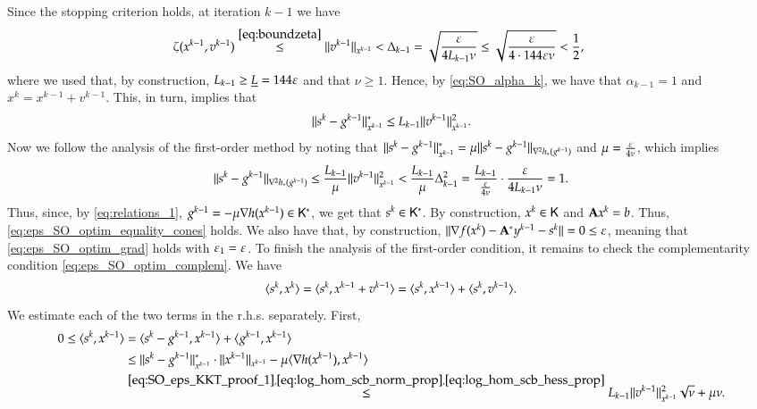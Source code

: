 Since the stopping criterion holds, at iteration $k-1$ we have
\begin{align}
\hspace{-1em}\zeta(x^{k-1},v^{k-1}) &\stackrel{\eqref{eq:boundzeta}}{\leq} \|v^{k-1}\|_{x^{k-1}} < \Delta_{k-1} = \sqrt{\frac{\varepsilon}{4L_{k-1}\nu}} \leq \sqrt{\frac{\varepsilon}{4 \cdot 144 \varepsilon \nu}} < \frac{1}{2}\label{eq:SO_eps_KKT_proof_0},
\end{align}
where we used that, by construction, $L_{k-1} \geq \underline{L} = 144 \varepsilon$ and that $\nu \geq 1$. Hence, by \eqref{eq:SO_alpha_k}, we have that $\alpha_{k-1}=1$ and $x^{k}=x^{k-1}+v^{k-1}$. This, in turn, implies that 
\begin{equation}
\label{eq:SO_eps_KKT_proof_1}
\lVert s^{k}-g^{k-1}\rVert^{\ast}_{x^{k-1}}\leq  L_{k-1}\lVert v^{k-1}\rVert^{2}_{x^{k-1}}.
\end{equation}
Now we follow the analysis of the first-order method by noting that $\lVert s^{k}-g^{k-1}\rVert^{\ast}_{x^{k-1}}=\mu\lVert s^{k}-g^{k-1}\rVert_{\nabla^{2}h_{\ast}(g^{k-1})}$ and $\mu=\frac{\varepsilon}{4\nu}$, 
which implies
\begin{equation}
\label{eq:SO_eps_KKT_proof_2}
\lVert s^{k}-g^{k-1}\rVert_{\nabla^{2}h_{\ast}(g^{k-1})}\leq\frac{L_{k-1}}{\mu}\lVert v^{k-1}\rVert^{2}_{x^{k-1}}<\frac{L_{k-1}}{\mu}\Delta_{k-1}^{2} = \frac{L_{k-1}}{\frac{\varepsilon}{4\nu}} \cdot \frac{\varepsilon}{4L_{k-1}\nu} = 1.
\end{equation}
Thus, since, by \eqref{eq:relations_1}, $g^{k-1}=-\mu\nabla h(x^{k-1})\in \mathsf{K}^{\ast}$, we get that $s^{k}\in\mathsf{K}^{\ast}$. By construction, $x^{k}\in \mathsf{K}$ and ${\mathbf A} x^{k} = b$. Thus, \eqref{eq:eps_SO_optim_equality_cones} holds. We also have that, by construction, $\|\nabla f(x^{k})-{\mathbf A}^{\ast}y^{k-1} - s^{k}\|=0\leq \varepsilon$, meaning that \eqref{eq:eps_SO_optim_grad} holds with $\varepsilon_1=\varepsilon$. To finish the analysis of the first-order condition, it remains to check the complementarity condition \eqref{eq:eps_SO_optim_complem}. 
We have
\begin{align*}
\langle s^{k},x^{k}\rangle=\langle s^{k},x^{k-1}+v^{k-1}\rangle=\langle s^{k},x^{k-1}\rangle+\langle s^{k},v^{k-1}\rangle.
\end{align*}
We estimate each of the two terms in the r.h.s. separately. First, 
\begin{align*}
0 \leq \inner{s^{k},x^{k-1}}&%
=  \inner{s^{k}-g^{k-1},x^{k-1}} + \inner{g^{k-1},x^{k-1}} \\
&\leq \norm{s^{k}-g^{k-1}}^{\ast}_{x^{k-1}}\cdot\norm{x^{k-1}}_{x^{k-1}}-\mu\inner{\nabla h(x^{k-1}),x^{k-1}} \\
&\stackrel{\eqref{eq:SO_eps_KKT_proof_1},\eqref{eq:log_hom_scb_norm_prop},\eqref{eq:log_hom_scb_hess_prop}}{\leq}  L_{k-1}\norm{v^{k-1}}^{2}_{x^{k-1}}\sqrt{\nu}+\mu\nu. %
\end{align*}
